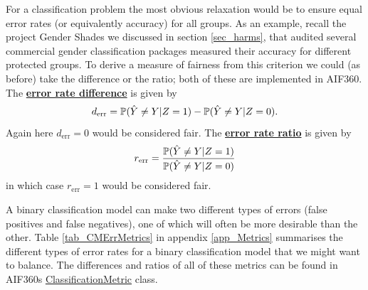 For a classification problem the most obvious relaxation would be to ensure equal error rates (or equivalently accuracy) for all groups. As an example, recall the project Gender Shades we discussed in section \ref{sec_harms}, that audited several commercial gender classification packages measured their accuracy for different protected groups. To derive a measure of fairness from this criterion we could (as before) take the difference or the ratio; both of these are implemented in AIF360. The \href{https://aif360.readthedocs.io/en/latest/modules/generated/aif360.metrics.ClassificationMetric.html#aif360.metrics.ClassificationMetric.error_rate_difference}{\textbf{error rate difference}} is given by
\[
d_{\text{err}} = \mathbb{P}(\hat{Y}\neq Y | Z=1) - \mathbb{P}(\hat{Y}\neq Y | Z=0).
\]
Again here $d_{\text{err}}=0$ would be considered fair. The \href{https://aif360.readthedocs.io/en/latest/modules/generated/aif360.metrics.ClassificationMetric.html#aif360.metrics.ClassificationMetric.error_rate_ratio}{\textbf{error rate ratio}} is given by
\[
r_{\text{err}} = \frac{\mathbb{P}(\hat{Y}\neq Y | Z=1)}
                      {\mathbb{P}(\hat{Y}\neq Y | Z=0)}
\]
in which case $r_{\text{err}}=1$ would be considered fair.

A binary classification model can make two different types of errors (false positives and false negatives), one of which will often be more desirable than the other. Table \ref{tab_CMErrMetrics} in appendix \ref{app_Metrics} summarises the different types of error rates for a binary classification model that we might want to balance. The differences and ratios of all of these metrics can be found in AIF360s \href{https://aif360.readthedocs.io/en/latest/modules/generated/aif360.metrics.ClassificationMetric.html#}{ClassificationMetric} class.

